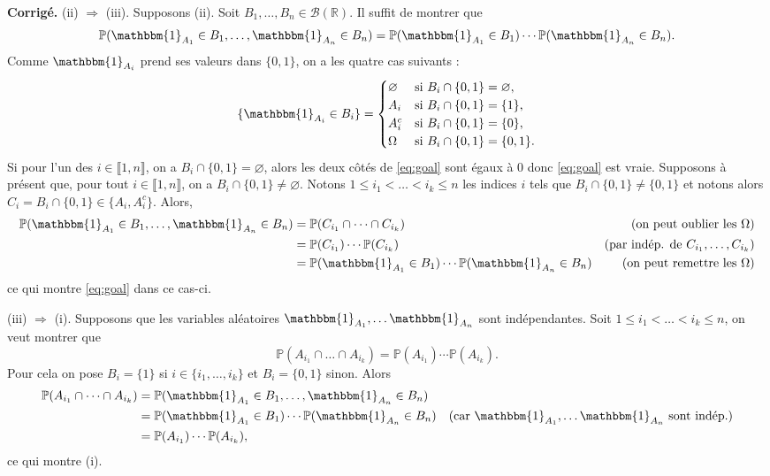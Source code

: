 \documentclass[a4paper,11pt]{article}
\newcommand{\R}{\mathbb{R}}
\renewcommand{\P}{\mathbb{P}}
\newcommand{\1}{\mathbbm{1}}
\newcommand{\cB}{\mathcal{B}}
\theoremstyle{plain}
\theoremstyle{definition}
\renewenvironment{comment}{\medskip\noindent \textcolor{BrickRed}{\textbf{Corrigé.}}}{}
\begin{document}
\begin{comment}
(ii) $\Rightarrow$ (iii). Supposons (ii). Soit $B_1,\dots,B_n \in \cB(\R)$. Il suffit de montrer que
\begin{equation} \label{eq:goal}
	\P(\1_{A_1} \in B_1, \dots, \1_{A_n} \in B_n)
	= \P(\1_{A_1} \in B_1) \cdots \P(\1_{A_n} \in B_n).
\end{equation}
Comme $\1_{A_i}$ prend ses valeurs dans $\{0,1\}$, on a les quatre cas suivants :
\[
	\{\1_{A_i} \in B_i \}
	= \begin{cases}
	\varnothing & \text{si } B_i \cap \{0,1\} = \varnothing, \\
	A_i & \text{si } B_i \cap \{0,1\} = \{1\}, \\
	A_i^c & \text{si } B_i \cap \{0,1\} = \{0\}, \\
	\Omega  & \text{si } B_i \cap \{0,1\} = \{0,1\}.
	\end{cases}
\]
Si pour l'un des $i \in \llbracket 1,n \rrbracket$, on a $B_i \cap \{0,1\} = \varnothing$, alors les deux côtés de \eqref{eq:goal} sont égaux à 0 donc \eqref{eq:goal} est vraie.
Supposons à présent que, pour tout $i \in \llbracket 1,n \rrbracket$, on a $B_i \cap \{0,1\} \neq \varnothing$.
Notons $1 \leq i_1 < \dots < i_k \leq n$ les indices $i$ tels que $B_i \cap \{0,1\} \neq \{0,1\}$ et notons alors $C_i = B_i \cap \{0,1\} \in \{A_i,A_i^c\}$.
Alors,
\begin{align*}
\P(\1_{A_1} \in B_1, \dots, \1_{A_n} \in B_n)
& = \P(C_{i_1} \cap \dots \cap C_{i_k}) & \text{(on peut oublier les $\Omega$)} \\
& = \P(C_{i_1}) \cdots \P(C_{i_k}) & \text{(par indép. de $C_{i_1}, \dots, C_{i_k}$)}  \\
& = \P(\1_{A_1} \in B_1) \cdots \P(\1_{A_n} \in B_n)
& \text{(on peut remettre les $\Omega$)}
\end{align*}
ce qui montre \eqref{eq:goal} dans ce cas-ci.


(iii) $\Rightarrow$ (i). Supposons que les variables aléatoires $\1_{A_1},\dots\1_{A_n}$ sont indépendantes.
Soit $1 \leq i_1 < \dots < i_k \leq n$, on veut montrer que 
\[
\P(A_{i_1} \cap \dots \cap A_{i_k}) 
= \P(A_{i_1}) \cdots \P(A_{i_k}).
\]
Pour cela on pose $B_i = \{1\}$ si $i \in \{i_1,\dots,i_k\}$ et $B_i = \{0,1\}$ sinon.
Alors
\begin{align*}
\P(A_{i_1} \cap \dots \cap A_{i_k}) 
& = \P(\1_{A_1} \in B_1, \dots, \1_{A_n} \in B_n) \\
& = \P(\1_{A_1} \in B_1) \cdots \P(\1_{A_n} \in B_n) 
& \text{(car $\1_{A_1},\dots\1_{A_n}$ sont indép.)} \\
& = \P(A_{i_1}) \cdots \P(A_{i_k}),
\end{align*}
ce qui montre (i).
\end{comment}
\end{document}
